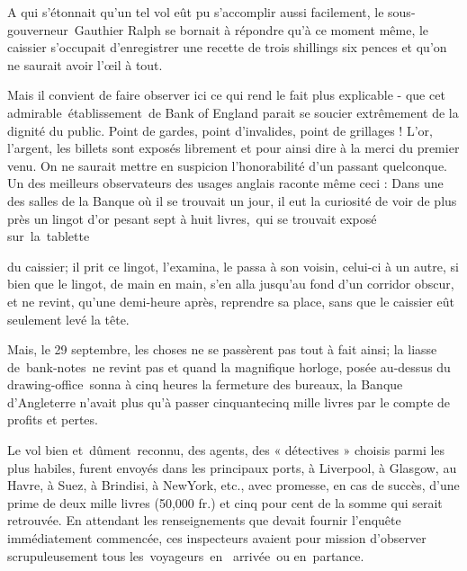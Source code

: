 \documentclass[]{book}
\begin{document}
               A qui s'étonnait qu'un tel vol eût pu
               s'accomplir aussi facilement, le sous-gouverneur Gauthier Ralph se bornait à répondre qu'à ce moment même, le caissier 
               s'occupait d'enregistrer une recette de 
               trois shillings six pences et qu'on ne saurait
               avoir l'œil à tout.
            
               Mais il convient de faire observer ici ce qui rend le fait plus explicable - que
               cet admirable établissement de Bank of 
               England parait se soucier extrêmement 
               de la dignité du public. Point de gardes,
               point d'invalides, point de grillages ! L'or,
               l'argent, les billets sont exposés librement
               et pour ainsi dire à la merci du premier
               venu. On ne saurait mettre en suspicion
               l'honorabilité d'un passant quelconque. Un
               des meilleurs observateurs des usages anglais raconte même ceci : Dans une des 
               salles de la Banque où il se trouvait un
               jour, il eut la curiosité de voir de plus
               près un lingot d'or pesant sept à huit livres, qui se trouvait exposé sur la tablette 
               
               du caissier; il prit ce lingot, l'examina, le
               passa à son voisin, celui-ci à un autre, si 
               bien que le lingot, de main en main, s'en 
               alla jusqu'au fond d'un corridor obscur, et 
               ne revint, qu'une demi-heure après, reprendre sa place, sans que le caissier eût seulement levé la tête.
            
               Mais, le 29 septembre, les choses ne se 
               passèrent pas tout à fait ainsi; la liasse
               de bank-notes ne revint pas et quand la
               magnifique horloge, posée au-dessus du 
               drawing-office sonna à cinq heures la
               fermeture des bureaux, la Banque d'Angleterre n'avait plus qu'à passer cinquantecinq mille livres par le compte de profits 
               et pertes.
            
               Le vol bien et dûment reconnu, des
               agents, des « détectives » choisis parmi les
               plus habiles, furent envoyés dans les principaux ports, à Liverpool, à Glasgow, au
               Havre, à Suez, à Brindisi, à NewYork, etc., avec promesse, en cas de succès, d'une prime de deux mille livres
               (50,000 fr.) et cinq pour cent de la somme
               qui serait retrouvée. En attendant les 
               renseignements que devait fournir l'enquête immédiatement commencée, ces inspecteurs avaient pour mission d'observer
               scrupuleusement tous les voyageurs en 
               arrivée ou en partance.
            
\end{document}
